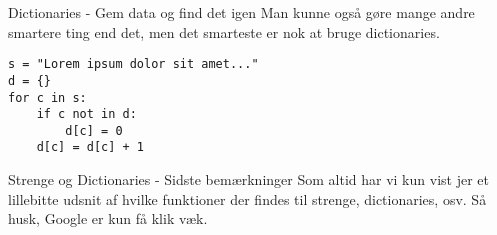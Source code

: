\documentclass[main.tex]{subfiles}
\begin{document}
\begin{frame}[fragile]{Dictionaries - Gem data og find det igen}
	Man kunne også gøre mange andre smartere ting end det, men det smarteste er nok at bruge dictionaries.
	\pause
	\begin{lstlisting}[style=python]
s = "Lorem ipsum dolor sit amet..."
d = {}
for c in s:
    if c not in d:
        d[c] = 0
    d[c] = d[c] + 1
	\end{lstlisting}
\end{frame}

\begin{frame}[fragile]{Strenge og Dictionaries - Sidste bemærkninger}
	Som altid har vi kun vist jer et lillebitte udsnit af hvilke funktioner der findes til strenge, dictionaries, osv. Så husk, Google er kun få klik væk.
\end{frame}







\end{document}

